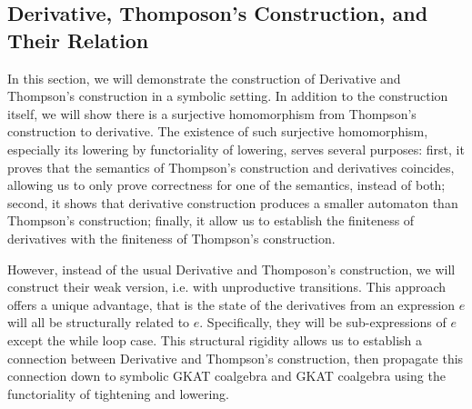 \documentclass{extarticle}
\newtheorem{corollary}[theorem]{Corollary}
\newcommand\altxrightarrow[2][0pt]{\mathrel{\ensurestackMath{\stackengine%
  {\dimexpr#1-7.5pt}{\xrightarrow{\phantom{#2}}}{\scriptstyle\!#2\,}%
  {O}{c}{F}{F}{S}}}}
\newcommand{\transvia}[1]{
    \mathrel{\raisebox{-2px}{\(\altxrightarrow[-2px]{#1}\)}}
}
\newcommand{\transAcc}[2]{⇒_{#1} #2}
\begin{document}






\subsection{Derivative, Thomposon's Construction, and Their Relation}

In this section, we will demonstrate the construction of Derivative and Thompson's construction in a symbolic setting.
In addition to the construction itself, we will show there is a surjective homomorphism from Thompson's construction to derivative.
The existence of such surjective homomorphism, especially its lowering by functoriality of lowering, serves several purposes: first, it proves that the semantics of Thompson's construction and derivatives coincides, allowing us to only prove correctness for one of the semantics, instead of both;  
second, it shows that derivative construction produces a smaller automaton than Thompson's construction; finally, it allow us to establish the finiteness of derivatives with the finiteness of Thompson's construction.

However, instead of the usual Derivative and Thomposon's construction, we will construct their weak version, i.e. with unproductive transitions.
This approach offers a unique advantage, that is the state of the derivatives from an expression \(e\) will all be structurally related to \(e\). 
Specifically, they will be sub-expressions of \(e\) except the while loop case.
This structural rigidity allows us to establish a connection between Derivative and Thompson's construction, then propagate this connection down to symbolic GKAT coalgebra and GKAT coalgebra using the functoriality of tightening and lowering.
\end{document}
